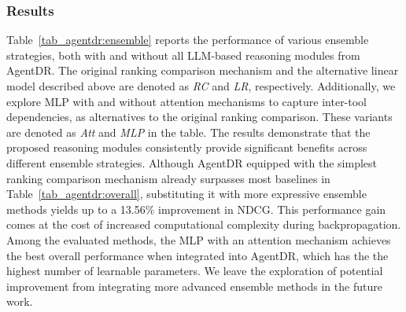 \subsubsection{Results} Table~\ref{tab_agentdr:ensemble} reports the performance of various ensemble strategies, both with and without all LLM-based reasoning modules from AgentDR. The original ranking comparison mechanism and the alternative linear model described above are denoted as \textit{RC} and \textit{LR}, respectively. Additionally, we explore MLP with and without attention mechanisms to capture inter-tool dependencies, as alternatives to the original ranking comparison. These variants are denoted as \textit{Att} and \textit{MLP} in the table. 
The results demonstrate that the proposed reasoning modules consistently provide significant benefits across different ensemble strategies. Although AgentDR equipped with the simplest ranking comparison mechanism already surpasses most baselines in Table~\ref{tab_agentdr:overall}, substituting it with more expressive ensemble methods yields up to a 13.56$\%$ improvement in NDCG. This performance gain comes at the cost of increased computational complexity during backpropagation. Among the evaluated methods, the MLP with an attention mechanism achieves the best overall performance when integrated into AgentDR, which has the the highest number of learnable parameters. We leave the exploration of potential improvement from integrating more advanced ensemble methods in the future work.

